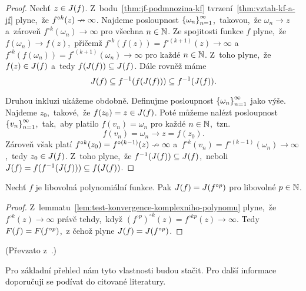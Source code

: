\begin{proof}
    Nechť $z\in J(f)$. Z~bodu~\ref{thm:jf-podmnozina-kf} tvrzení~\ref{thm:vztah-kf-a-jf} plyne,~že $f^{\circ k}(z)\nrightarrow\infty$. Najdeme posloupnost $\left\{\omega_n\right\}_{n=1}^\infty$,~takovou,~že $\omega_n\to z$ a~zároveň $f^{\circ k}(\omega_n)\to\infty$ pro všechna $n\in\mathbb{N}$. Ze spojitosti funkce $f$ plyne,~že $f(\omega_n)\to f(z)$,~přičemž $f^{\circ k}(f(z))=f^{\circ(k+1)}(z)\to\infty$ a~$f^{\circ k}(f(\omega_n))=f^{\circ(k+1)}(\omega_n)\to\infty$ pro každé $n\in\mathbb{N}$. Z~toho plyne,~že $f(z)\in J(f)$ a~tedy $f(J(f))\subseteq J(f)$. Dále rovněž máme
    \[J(f)\subseteq f^{-1}(f(J(f)))\subseteq f^{-1}(J(f)).\]

    Druhou inkluzi ukážeme obdobně. Definujme posloupnost $\left\{\omega_n\right\}_{n=1}^\infty$ jako výše. Najdeme $z_0$,~takové,~že $f(z_0)=z\in J(f)$. Poté můžeme nalézt posloupnost $\left\{v_n\right\}_{n=1}^\infty$,~tak,~aby platilo $f(v_n)=\omega_n$ pro každé $n\in\mathbb{N}$,~tzn.
    \[f(v_n)=\omega_n\to z=f(z_0).\]
    Zároveň však platí $f^{\circ k}(z_0)=f^{\circ(k-1)}(z)\nrightarrow\infty$ a~$f^{\circ k}(v_n)=f^{\circ(k-1)}(\omega_n)\to\infty$,~tedy $z_0\in J(f)$. Z~toho plyne,~že $f^{-1}(J(f))\subseteq J(f)$,~neboli $J(f)=f(f^{-1}(J(f)))\subseteq f(J(f))$.
\end{proof}
\begin{theorem}\label{ekvivalence-jf-a-jfp}
    Nechť $f$ je libovolná polynomiální funkce. Pak $J(f)=J(f^{\circ p})$ pro libovolné $p\in\mathbb{N}$.
\end{theorem}
\begin{proof}
    Z~lemmatu~\ref{lem:test-konvergence-komplexniho-polynomu} plyne,~že $f^{\circ k}(z)\to\infty$ právě tehdy,~když $(f^{\circ p})^{\circ k}(z)=f^{\circ kp}(z)\to\infty$. Tedy $F(f)=F(f^{\circ p})$,~z čehož plyne $J(f)=J(f^{\circ p})$.
\end{proof}
(Převzato z~\citep[str. 238]{Falconer1989}.)

Pro základní přehled nám tyto vlastnosti budou stačit. Pro další informace doporučuji se podívat do citované literatury.

